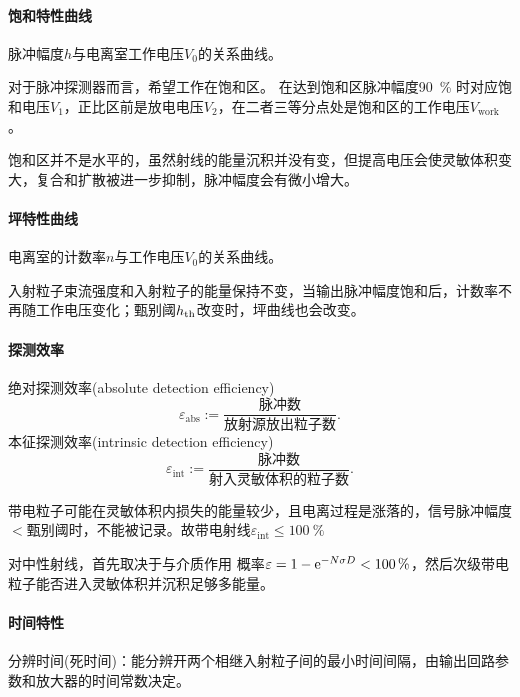 \paragraph{饱和特性曲线}
脉冲幅度$h$与电离室工作电压$V_0$的关系曲线。
\begin{notecaptionblock}
\end{notecaptionblock}
对于脉冲探测器而言，希望工作在饱和区。
在达到饱和区脉冲幅度\qty{90}{\percent} 时对应饱和电压$V_1$，正比区前是放电电压$V_2$，在二者三等分点处是饱和区的工作电压$V_{\mathrm{work}}$。

饱和区并不是水平的，虽然射线的能量沉积并没有变，但提高电压会使灵敏体积变大，复合和扩散被进一步抑制，脉冲幅度会有微小增大。
\paragraph{坪特性曲线}
电离室的计数率$n$与工作电压$V_0$的关系曲线。
\begin{notecaptionblock}
\end{notecaptionblock}
入射粒子束流强度和入射粒子的能量保持不变，当输出脉冲幅度饱和后，计数率不再随工作电压变化；甄别阈$h_{\mathrm{th}}$改变时，坪曲线也会改变。
\paragraph{探测效率}
绝对探测效率(absolute detection efficiency)
\begin{equation}\label{eq:nrd-absolute-efficiency}
	\varepsilon_{\mathrm{abs}} := \frac{\text{脉冲数}}{\text{放射源放出粒子数}}.
\end{equation}
本征探测效率(intrinsic detection efficiency)
\begin{equation}\label{eq:nrd-intrinsic-efficiency}
	\varepsilon_{\mathrm{int}} := \frac{\text{脉冲数}}{\text{射入灵敏体积的粒子数}}.
\end{equation}

带电粒子可能在灵敏体积内损失的能量较少，且电离过程是涨落的，信号脉冲幅度$<$甄别阈时，不能被记录。故带电射线$\varepsilon_{\mathrm{int}} \leqslant \qty{100}{\percent}$

对中性射线，首先取决于与介质作用%
概率$\varepsilon = 1 - \mathop{}\!\mathrm{e}^{-N\sigma D} < \qty{100}{\percent}$，然后次级带电粒子能否进入灵敏体积并沉积足够多能量。
\paragraph{时间特性}
分辨时间(死时间)：能分辨开两个相继入射粒子间的最小时间间隔，由输出回路参数和放大器的时间常数决定。

